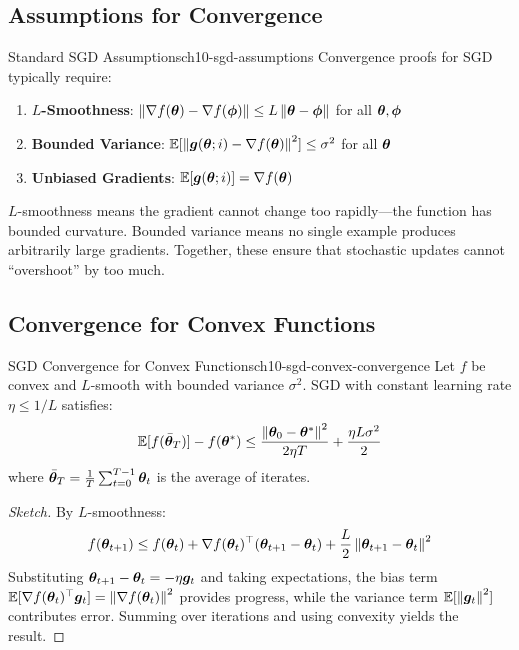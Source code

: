 \documentclass[../../main.tex]{subfiles}
\begin{document}
\subsection{Assumptions for Convergence}

\begin{definition}{Standard SGD Assumptions}{ch10-sgd-assumptions}
Convergence proofs for SGD typically require:
\begin{enumerate}
    \item \textbf{$L$-Smoothness}: $\left\lVert \nabla f(\boldsymbol{\theta}) - \nabla f(\boldsymbol{\phi}) \right\rVert \leq L \left\lVert \boldsymbol{\theta} - \boldsymbol{\phi} \right\rVert$ for all $\boldsymbol{\theta}, \boldsymbol{\phi}$

    \item \textbf{Bounded Variance}: $\operatorname{\mathbb{E}}[\left\lVert \boldsymbol{g}(\boldsymbol{\theta}; i) - \nabla f(\boldsymbol{\theta}) \right\rVert^2] \leq \sigma^2$ for all $\boldsymbol{\theta}$

    \item \textbf{Unbiased Gradients}: $\operatorname{\mathbb{E}}[\boldsymbol{g}(\boldsymbol{\theta}; i)] = \nabla f(\boldsymbol{\theta})$
\end{enumerate}
\end{definition}

\begin{intuition}
$L$-smoothness means the gradient cannot change too rapidly---the function has bounded curvature. Bounded variance means no single example produces arbitrarily large gradients. Together, these ensure that stochastic updates cannot ``overshoot'' by too much.
\end{intuition}

\subsection{Convergence for Convex Functions}

\begin{theorem}{SGD Convergence for Convex Functions}{ch10-sgd-convex-convergence}
Let $f$ be convex and $L$-smooth with bounded variance $\sigma^2$. SGD with constant learning rate $\eta \leq 1/L$ satisfies:
\[
    \operatorname{\mathbb{E}}[f(\bar{\boldsymbol{\theta}}_T)] - f(\boldsymbol{\theta}^*) \leq \frac{\left\lVert \boldsymbol{\theta}_0 - \boldsymbol{\theta}^* \right\rVert^2}{2\eta T} + \frac{\eta L \sigma^2}{2}
\]
where $\bar{\boldsymbol{\theta}}_T = \frac{1}{T}\sum_{t=0}^{T-1} \boldsymbol{\theta}_t$ is the average of iterates.
\end{theorem}

\begin{proof}[Sketch]
By $L$-smoothness:
\[
    f(\boldsymbol{\theta}_{t+1}) \leq f(\boldsymbol{\theta}_t) + \nabla f(\boldsymbol{\theta}_t)^\top(\boldsymbol{\theta}_{t+1} - \boldsymbol{\theta}_t) + \frac{L}{2}\left\lVert \boldsymbol{\theta}_{t+1} - \boldsymbol{\theta}_t \right\rVert^2
\]
Substituting $\boldsymbol{\theta}_{t+1} - \boldsymbol{\theta}_t = -\eta \boldsymbol{g}_t$ and taking expectations, the bias term $\operatorname{\mathbb{E}}[\nabla f(\boldsymbol{\theta}_t)^\top \boldsymbol{g}_t] = \left\lVert \nabla f(\boldsymbol{\theta}_t) \right\rVert^2$ provides progress, while the variance term $\operatorname{\mathbb{E}}[\left\lVert \boldsymbol{g}_t \right\rVert^2]$ contributes error. Summing over iterations and using convexity yields the result.
\end{proof}
\end{document}
